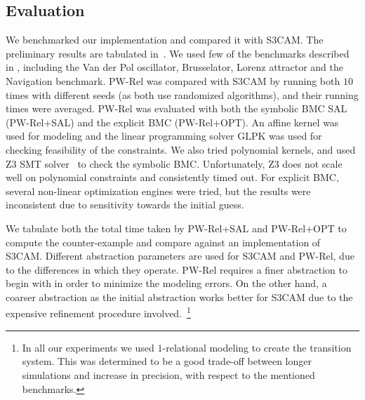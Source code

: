 

\subsection{Evaluation}

We benchmarked our implementation and compared it with S3CAM.  The
preliminary results are tabulated in~. We used few of
the benchmarks described in \cite{zutshi2014multiple}, including the
Van der Pol oscillator, Brusselator, Lorenz attractor and the
Navigation benchmark.
PW-Rel was compared with
S3CAM by running both $10$ times with different seeds (as both use
randomized algorithms), and their running times were averaged. PW-Rel
was evaluated with both the symbolic BMC SAL (PW-Rel+SAL) and the
explicit BMC (PW-Rel+OPT). %
An affine kernel was used for modeling and the linear programming
solver GLPK was used for checking feasibility of the constraints.
We also tried polynomial kernels, and used Z3 SMT
solver~\cite{DeMoura+Bjorner/08/Z3} to check the symbolic BMC.
Unfortunately, Z3 does not scale well on polynomial constraints and
consistently timed out. For explicit BMC, several non-linear
optimization engines were tried, but the results were inconsistent due
to sensitivity towards the initial guess.

We tabulate both the total time taken by PW-Rel+SAL and PW-Rel+OPT to
compute the counter-example and compare against an implementation of
S3CAM.  Different abstraction parameters are used for S3CAM and
PW-Rel, due to the differences in which they operate. PW-Rel
requires a finer abstraction to begin with in order to minimize the
modeling errors. On the other hand, a coarser abstraction as the
initial abstraction works better for S3CAM due to the expensive
refinement procedure involved.~\footnote{In all our experiments we
used $1$-relational modeling to create the transition system.
This was determined to be a good trade-off between longer simulations
and increase in precision, with respect to the mentioned benchmarks.}

